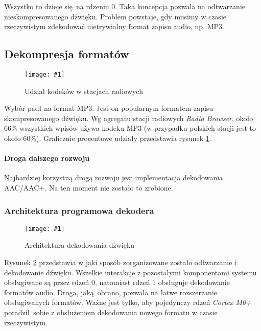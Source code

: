 \documentclass[12pt]{report}
\newcommand{\imgint}[4]{
	\begin{figure}[{#4}]
		\centering
		\texttt{[image: \#1]}
		\caption{#2}
		\label{#1}
	\end{figure}
}
\newcommand{\imgh}[3]{\imgint{#1}{#2}{#3}{H}}
\begin{document}

	Wszystko to dzieje się na rdzeniu 0. Taka koncepcja pozwala na odtwarzanie nieskompresowanego dźwięku. Problem powstaje, gdy musimy w czasie rzeczywistym zdekodować nietrywialny format zapisu audio, np. MP3.
	
	\subsection{Dekompresja formatów}
	\imgh{3/rb_chart_new}{Udział kodeków w stacjach radiowych}{0.9}
	
	Wybór padł na format MP3. Jest on popularnym formatem zapisu skompresowanego dźwięku. Wg agregatu stacji radiowych \textit{Radio Browser}\textsuperscript{\cite{radio_browser_codecs}}, około 66\% wszystkich wpisów używa kodeku MP3 (w przypadku polskich stacji jest to około 60\%). Graficznie procentowe udziały przedstawia rysunek \ref{3/rb_chart_new}.
	
	\paragraph{Droga dalszego rozwoju}
	Najbardziej korzystną drogą rozwoju jest implementacja dekodowania AAC/AAC+. Na ten moment nie zostało to zrobione.
	$ $\\
	
	\subsubsection{Architektura programowa dekodera}
	\imgh{3/PicoRadio-sound-decoding}{Architektura dekodowania dźwięku}{0.95}
	
	Rysunek \ref{3/PicoRadio-sound-decoding} przedstawia w jaki sposób zorganizowane zostało odtwarzanie i dekodowanie dźwięku. Wszelkie interakcje z pozostałymi komponentami systemu obsługiwane są przez rdzeń 0, natomiast rdzeń 1 obsługuje dekodowanie formatów audio. Droga, jaką obrano, pozwala na łatwe rozszerzanie obsługiwanych formatów. Ważne jest tylko, aby pojedynczy rdzeń \textit{Cortex M0+} poradził sobie z obsłużeniem dekodowania nowego formatu w czasie rzeczywistym.
	
\end{document}
